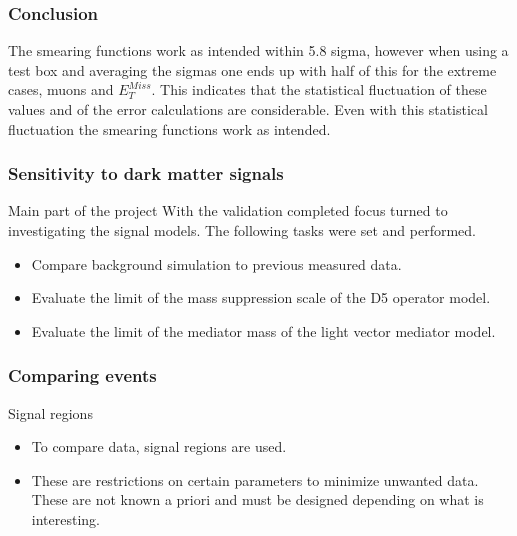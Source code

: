 \documentclass[handout]{beamer}
\begin{document}
\begin{frame}[shrink=10]\frametitle{Conclusion}
\begin{block}{}
The smearing functions work as intended within 5.8 sigma, however when using a test box and averaging the sigmas one ends up with half of this for the extreme
cases, muons and $E_T^{Miss}$. This indicates that the statistical fluctuation of these values and of the error calculations are considerable. Even with this statistical fluctuation the smearing functions work as intended.
\end{block}
\end{frame}


\begin{frame}[shrink=10]\frametitle{Sensitivity to dark matter signals}
\begin{block}{Main part of the project}
With the validation completed focus turned to investigating the signal models. The following tasks were set and performed.
\begin{itemize}
\item Compare background simulation to previous measured data.
\item Evaluate the limit of the mass suppression scale of the D5 operator model.
\item Evaluate the limit of the mediator mass of the light vector mediator model. 
\end{itemize}
\end{block}
\end{frame}

\begin{frame}[shrink=10]\frametitle{Comparing events}
\begin{block}{Signal regions}
\begin{itemize}
\item To compare data, signal regions are used.
\item These are restrictions on certain parameters to minimize unwanted data. These are not known a priori and must be designed depending on what is interesting.
\end{itemize}
\end{block}
\end{frame}
\end{document}
